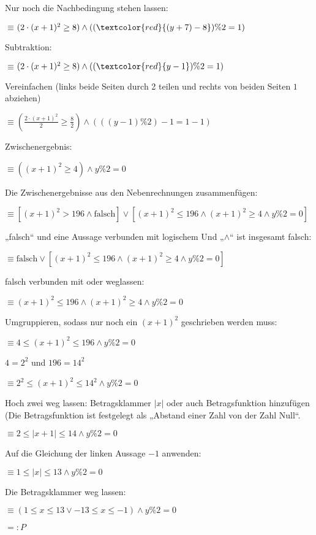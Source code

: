 \documentclass{lehramt-informatik-haupt}
\def\MatheEnv#1{
  \medskip

  \hspace{2em}#1

  \medskip
}
\def\Mathe#1{
  \MatheEnv{$#1$}
}
\def\MatheEquiv#1{
  \MatheEnv{$\equiv$\hspace{2em}$#1$}
}
\def\Erklaerung#1{
  \medskip
  {\footnotesize#1}
}
\begin{document}
\begin{antwort}
\Erklaerung{Nur noch die Nachbedingung stehen lassen:}

\MatheEquiv{
  (2 \cdot (x + 1)^2 \geq 8) \land ((\textcolor{red}{(y + 7) - 8}) \% 2 = 1)
}

\Erklaerung{Subtraktion:}

\MatheEquiv{
  (2 \cdot (x + 1)^2 \geq 8) \land ((\textcolor{red}{y - 1}) \% 2 = 1)
}

\Erklaerung{Vereinfachen (links beide Seiten durch 2 teilen und rechts
von beiden Seiten $1$ abziehen)}

\MatheEquiv{
  (\frac{2 \cdot (x + 1)^2}{2} \geq \frac{8}{2}) \land (((y - 1) \% 2) - 1 = 1 - 1)
}

\Erklaerung{Zwischenergebnis:}

\MatheEquiv{
((x + 1)^2 \geq 4) \land y \% 2 = 0
}

\vspace{1cm}


\Erklaerung{Die Zwischenergebnisse aus den Nebenrechnungen
zusammenfügen:}

\MatheEquiv{
  [
    (x + 1)^2 > 196 \land
    \text{falsch}
  ]
  \lor
  [
    (x + 1)^2 \leq 196 \land
    (x + 1)^2 \geq 4 \land y\%2 = 0
  ]
}

\Erklaerung{„falsch“ und eine Aussage verbunden mit logischem Und
„$\land$“ ist insgesamt falsch:}

\MatheEquiv{
  \text{falsch}
  \lor
  [
    (x + 1)^2 \leq 196 \land
    (x + 1)^2 \geq 4 \land y\%2 = 0
  ]
}

\Erklaerung{falsch verbunden mit oder weglassen:}

\MatheEquiv{
  (x + 1)^2 \leq 196
  \land
  (x + 1)^2 \geq 4 \land y\%2 = 0
}

\Erklaerung{Umgruppieren, sodass nur noch ein $(x + 1)^2$ geschrieben
werden muss:}

\MatheEquiv{
  4 \leq (x + 1)^2 \leq 196
  \land
  y\%2 = 0
}

$4 = 2^2$ und $196 = 14^2$

\MatheEquiv{
  2^2 \leq (x + 1)^2 \leq 14^2
  \land
  y\%2 = 0
}

\Erklaerung{Hoch zwei weg lassen: Betragsklammer $|x|$ oder auch
Betragsfunktion hinzufügen (Die Betragsfunktion ist festgelegt als
„Abstand einer Zahl von der Zahl Null“.}

\MatheEquiv{
  2 \leq | x + 1 | \leq 14 \land y\%2 = 0
}

\Erklaerung{Auf die Gleichung der linken Aussage $-1$ anwenden:}

\MatheEquiv{
  1 \leq |x| \leq 13 \land y\%2 = 0
}

\Erklaerung{Die Betragsklammer weg lassen:}

\MatheEquiv{
  (1 \leq x \leq 13 \lor -13 \leq x \leq -1) \land y\%2 = 0
}

\Mathe{=: P}

\end{antwort}
\end{document}
